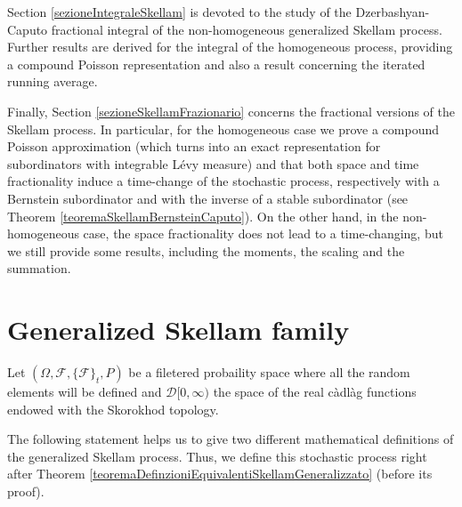\documentclass[12pt, twoside, english, headsepline]{article}
\theoremstyle{definition} %
\numberwithin{equation}{section} %
\begin{document}
Section \ref{sezioneIntegraleSkellam} is devoted to the study of the Dzerbashyan-Caputo fractional integral of the non-homogeneous generalized Skellam process. Further results are derived for the integral of the homogeneous process, providing a compound Poisson representation and also a result concerning the iterated running average. 

Finally, Section \ref{sezioneSkellamFrazionario} concerns the fractional versions of the Skellam process. In particular, for the homogeneous case we prove a compound Poisson approximation (which turns into an exact representation for subordinators with integrable L\'{e}vy measure) and that both space and time fractionality induce a time-change of the stochastic process, respectively with a Bernstein subordinator and with the inverse of a stable subordinator (see Theorem \ref{teoremaSkellamBernsteinCaputo}). On the other hand, in the non-homogeneous case, the space fractionality does not lead to a time-changing, but we still provide some results, including the moments, the scaling and the summation.





\section{Generalized Skellam family}\label{sezioneFamigliaSkellam}


Let $(\Omega, \mathcal{F}, \{\mathcal{F}\}_t, P)$ be a filetered probaility space where all the random elements will be defined and  $\mathcal{D}[0,\infty)$ the space of the real c\`{a}dl\`{a}g functions endowed with the Skorokhod topology.

The following statement helps us to give two different mathematical definitions of the generalized Skellam process. Thus, we define this stochastic process right after Theorem \ref{teoremaDefinzioniEquivalentiSkellamGeneralizzato} (before its proof).
\end{document}
